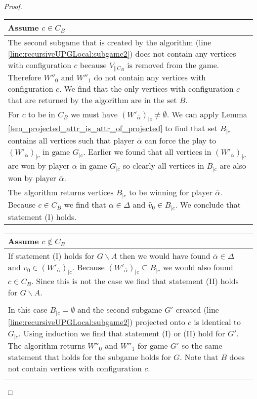\begin{theorem}
\begin{proof}
		\begin{longtable}{|p{14.2cm}}
				Assume $c \in C_B$\\
				\hline
				The second subgame that is created by the algorithm (line \ref{line:recursiveUPGLocal:subgame2}) does not contain any vertices with configuration $c$ because $V_{||C_B}$ is removed from the game. Therefore $W''_0$ and $W''_1$ do not contain any vertices with configuration $c$. We find that the only vertices with configuration $c$ that are returned by the algorithm are in the set $B$.\\
				For $c$ to be in $C_B$ we must have $(W'_{\overline{\alpha}})_{|c} \neq \emptyset$. We can apply Lemma \ref{lem_projected_attr_is_attr_of_projected} to find that set $B_{|c}$ contains all vertices such that player $\overline{\alpha}$ can force the play to $(W'_{\overline{\alpha}})_{|c}$ in game $G_{|c}$. Earlier we found that all vertices in $(W'_{\overline{\alpha}})_{|c}$ are won by player $\overline{\alpha}$ in game $G_{|c}$ so clearly all vertices in $B_{|c}$ are also won by player $\overline{\alpha}$.\\
				The algorithm returns vertices $B_{|c}$ to be winning for player $\overline{\alpha}$. Because $c \in C_B$ we find that $\overline{\alpha} \in \Delta$ and $\hat{v}_0 \in B_{|c}$. We conclude that statement (I) holds.
		\end{longtable}
		\begin{longtable}{|p{14.2cm}}
			Assume $c \notin C_B$\\
			\hline
			If statement (I) holds for $G\backslash A$ then we would have found $\overline{\alpha} \in \Delta$ and $\hat{v}_0 \in (W'_{\overline{\alpha}})_{|c}$. Because $(W'_{\overline{\alpha}})_{|c} \subseteq B_{|c}$ we would also found $c \in C_B$. Since this is not the case we find that statement (II) holds for $G\backslash A$.\\
			\begin{tabular}{|p{13.6cm}}
				Assume $(W'_{\overline{\alpha}})_{|c} = \emptyset$\\
				\hline
				In this case $B_{|c} = \emptyset$ and the second subgame $G'$ created (line \ref{line:recursiveUPGLocal:subgame2}) projected onto $c$ is identical to $G_{|c}$. Using induction we find that statement (I) or (II) hold for $G'$. The algorithm returns $W''_0$ and $W''_1$ for game $G'$ so the same statement that holds for the subgame holds for $G$. Note that $B$ does not contain vertices with configuration $c$.
			\end{tabular}\\\\

\end{longtable}
\end{proof}
\end{theorem}
